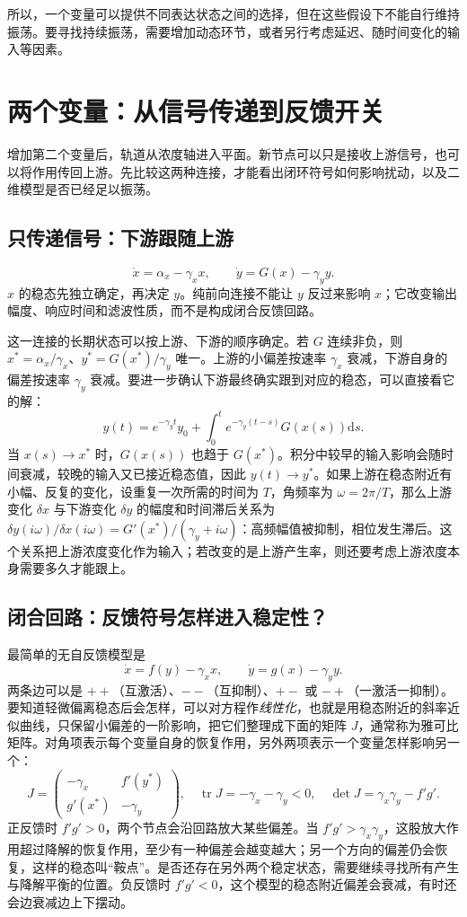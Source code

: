 \documentclass[11pt,a4paper,UTF8,fontset=fandol]{ctexart}
\newcommand{\dd}{\mathrm d}\newcommand{\R}{\mathbb R}\newcommand{\ssv}{\mathrm{ss}}
\begin{document}
所以，一个变量可以提供不同表达状态之间的选择，但在这些假设下不能自行维持振荡。要寻找持续振荡，需要增加动态环节，或者另行考虑延迟、随时间变化的输入等因素。

\section{两个变量：从信号传递到反馈开关}
增加第二个变量后，轨道从浓度轴进入平面。新节点可以只是接收上游信号，也可以将作用传回上游。先比较这两种连接，才能看出闭环符号如何影响扰动，以及二维模型是否已经足以振荡。
\subsection{只传递信号：下游跟随上游}
\begin{equation}\dot x=\alpha_x-\gamma_xx,\qquad\dot y=G(x)-\gamma_yy.\end{equation}
$x$ 的稳态先独立确定，再决定 $y$。纯前向连接不能让 $y$ 反过来影响 $x$；它改变输出幅度、响应时间和滤波性质，而不是构成闭合反馈回路。

这一连接的长期状态可以按上游、下游的顺序确定。若 $G$ 连续非负，则 $x^*=\alpha_x/\gamma_x$、$y^*=G(x^*)/\gamma_y$ 唯一。上游的小偏差按速率 $\gamma_x$ 衰减，下游自身的偏差按速率 $\gamma_y$ 衰减。要进一步确认下游最终确实跟到对应的稳态，可以直接看它的解：
\[
y(t)=e^{-\gamma_yt}y_0+\int_0^t e^{-\gamma_y(t-s)}G(x(s))\dd s.
\]
当 $x(s)\to x^*$ 时，$G(x(s))$ 也趋于 $G(x^*)$。积分中较早的输入影响会随时间衰减，较晚的输入又已接近稳态值，因此 $y(t)\to y^*$。如果上游在稳态附近有小幅、反复的变化，设重复一次所需的时间为 $T$，角频率为 $\omega=2\pi/T$，那么上游变化 $\delta x$ 与下游变化 $\delta y$ 的幅度和时间滞后关系为
$\delta y(i\omega)/\delta x(i\omega)=G'(x^*)/(\gamma_y+i\omega)$：高频幅值被抑制，相位发生滞后。这个关系把上游浓度变化作为输入；若改变的是上游产生率，则还要考虑上游浓度本身需要多久才能跟上。

\subsection{闭合回路：反馈符号怎样进入稳定性？}
最简单的无自反馈模型是
\begin{equation}\dot x=f(y)-\gamma_xx,\qquad\dot y=g(x)-\gamma_yy.\label{eq:two}\end{equation}
两条边可以是 $++$（互激活）、$--$（互抑制）、$+-$ 或 $-+$（一激活一抑制）。要知道轻微偏离稳态后会怎样，可以对方程作\emph{线性化}，也就是用稳态附近的斜率近似曲线，只保留小偏差的一阶影响，把它们整理成下面的矩阵 $J$，通常称为雅可比矩阵。对角项表示每个变量自身的恢复作用，另外两项表示一个变量怎样影响另一个：
\begin{equation}J=\begin{pmatrix}-\gamma_x&f'(y^*)\\g'(x^*)&-\gamma_y\end{pmatrix},\quad \operatorname{tr}J=-\gamma_x-\gamma_y<0,\quad\det J=\gamma_x\gamma_y-f'g'.\end{equation}
正反馈时 $f'g'>0$，两个节点会沿回路放大某些偏差。当 $f'g'>\gamma_x\gamma_y$，这股放大作用超过降解的恢复作用，至少有一种偏差会越变越大；另一个方向的偏差仍会恢复，这样的稳态叫“鞍点”。是否还存在另外两个稳定状态，需要继续寻找所有产生与降解平衡的位置。负反馈时 $f'g'<0$，这个模型的稳态附近偏差会衰减，有时还会边衰减边上下摆动。
\end{document}
